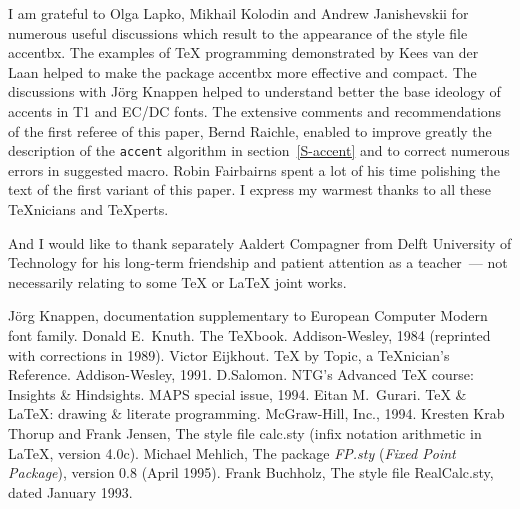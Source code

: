 I am grateful to Olga Lapko, Mikhail Kolodin and Andrew Janishevskii
for numerous useful discussions which result
to the appearance of the style file {\sc accentbx}.
The examples of \TeX{} programming demonstrated
by Kees van der Laan helped to make the package {\sc accentbx}
more effective and compact. The discussions with J\"org Knappen
helped to understand better the base ideology of accents in T1 and EC/DC fonts.
The extensive comments and recommendations of the first referee
of this paper, Bernd Raichle, enabled to improve greatly the description
of the {\tt\bs{}accent} algorithm in section~\ref{S-accent}
and to correct numerous errors in suggested macro.
Robin Fairbairns spent a lot of his time
polishing the text of the first variant of this paper.
I express my warmest thanks to all these \TeX{}nicians and \TeX{}perts.

And I would like to thank separately
Aaldert Compagner from Delft University of Technology for his
long-term friendship and patient attention as a teacher~--- not
necessarily relating to some \TeX{} or \LaTeX{} joint works.

\begin{thebibliography}{00}
 J\"org Knappen, documentation supplementary to
        European Computer Modern font family.
        Donald E.\ Knuth.
        The \TeX{}book.
        Addison-Wesley, 1984 (reprinted with corrections in 1989).
        Victor Eijkhout.
        \TeX{} by Topic, a \TeX{}nician's Reference.
        Addison-Wesley, 1991.
        D.Salomon.
        NTG's Advanced \TeX{} course: Insights \& Hindsights.
        MAPS special issue, 1994.
        Eitan M.\ Gurari. \TeX{} \& \LaTeX: drawing \&
        literate programming. McGraw-Hill, Inc., 1994.
        Kresten Krab Thorup and Frank Jensen,
        The style file {\sc calc.sty} (infix notation
        arithmetic in \LaTeX, version 4.0c).
        Michael Mehlich,
        The package {\sl FP.sty} ({\em Fixed Point Package}),
        version 0.8 (April 1995).
        Frank Buchholz,
        The style file {\sc RealCalc.sty},
        dated January 1993.
\end{thebibliography}
\endinput

